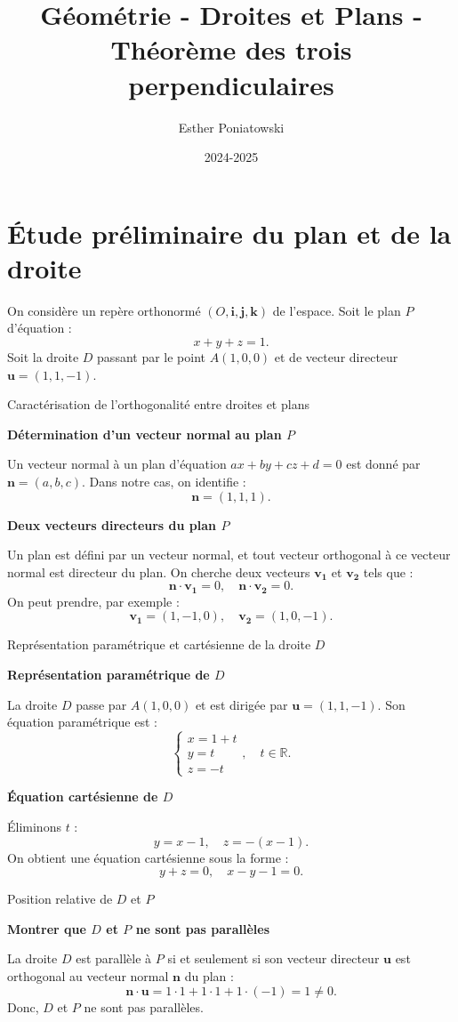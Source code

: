 \documentclass[10pt,a4paper]{article}
\title{Géométrie - Droites et Plans - Théorème des trois perpendiculaires}
\author{Esther Poniatowski}
\date{2024-2025}
\begin{document}
\section{Étude préliminaire du plan et de la droite}

On considère un repère orthonormé $(O, \mathbf{i}, \mathbf{j}, \mathbf{k})$ de l'espace. Soit le
plan $P$ d'équation :
   \[
   x + y + z = 1.
   \]
Soit la droite $D$ passant par le point $A(1, 0, 0)$ et de vecteur directeur $\mathbf{u} =
(1,1,-1)$.

\q Caractérisation de l'orthogonalité entre droites et plans
\setcounter{ql}{0}

\ql \textbf{Détermination d'un vecteur normal au plan $P$}

Un vecteur normal à un plan d'équation $ax + by + cz + d = 0$ est donné par $\mathbf{n} = (a, b,
c)$. Dans notre cas, on identifie :
\[
\mathbf{n} = (1,1,1).
\]

\ql \textbf{Deux vecteurs directeurs du plan $P$}

Un plan est défini par un vecteur normal, et tout vecteur orthogonal à ce vecteur normal est
directeur du plan. On cherche deux vecteurs $\mathbf{v_1}$ et $\mathbf{v_2}$ tels que :
\[
\mathbf{n} \cdot \mathbf{v_1} = 0, \quad \mathbf{n} \cdot \mathbf{v_2} = 0.
\]
On peut prendre, par exemple :
\[
\mathbf{v_1} = (1,-1,0), \quad \mathbf{v_2} = (1,0,-1).
\]

\q Représentation paramétrique et cartésienne de la droite $D$
\setcounter{ql}{0}

\ql \textbf{Représentation paramétrique de $D$}

La droite $D$ passe par $A(1,0,0)$ et est dirigée par $\mathbf{u} = (1,1,-1)$. Son équation
paramétrique est :
\[
\begin{cases}
x = 1 + t \\
y = t \\
z = -t
\end{cases}, \quad t \in \mathbb{R}.
\]

\ql \textbf{Équation cartésienne de $D$}

Éliminons $t$ :
\[
y = x - 1, \quad z = - (x - 1).
\]
On obtient une équation cartésienne sous la forme :
\[
y + z = 0, \quad x - y - 1 = 0.
\]

\q Position relative de $D$ et $P$
\setcounter{ql}{0}

\ql \textbf{Montrer que $D$ et $P$ ne sont pas parallèles}

La droite $D$ est parallèle à $P$ si et seulement si son vecteur directeur $\mathbf{u}$ est
orthogonal au vecteur normal $\mathbf{n}$ du plan :
\[
\mathbf{n} \cdot \mathbf{u} = 1 \cdot 1 + 1 \cdot 1 + 1 \cdot (-1) = 1 \neq 0.
\]
Donc, $D$ et $P$ ne sont pas parallèles.
\end{document}
